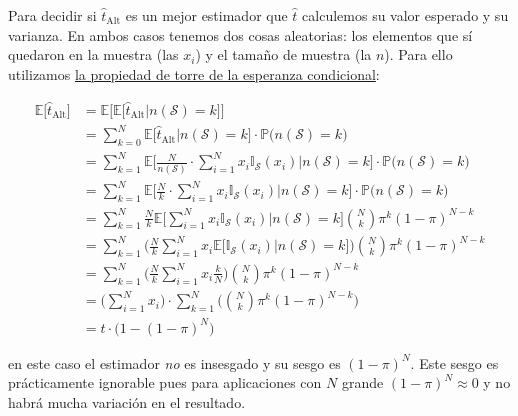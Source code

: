 \documentclass[
]{book}
\begin{document}
Para decidir si \(\hat{t}_{\text{Alt}}\) es un mejor estimador que \(\hat{t}\) calculemos su valor esperado y su varianza. En ambos casos tenemos dos cosas aleatorias: los elementos que sí quedaron en la muestra (las \(x_i\)) y el tamaño de muestra (la \(n\)). Para ello utilizamos \href{https://en.wikipedia.org/wiki/Law_of_total_expectation}{la propiedad de torre de la esperanza condicional}:

\begin{equation}\nonumber
\begin{aligned}
 \mathbb{E}\big[ \hat{t}_{\text{Alt}} \big] & = \mathbb{E}\Big[ \mathbb{E}\big[ \hat{t}_{\text{Alt}}  \big| n(\mathcal{S}) = k \big] \Big]   \\
 & = \sum\limits_{k = 0}^N  \mathbb{E}\Big[ \hat{t}_{\text{Alt}} \Big| n(\mathcal{S}) = k \Big]  \cdot \mathbb{P}\big(n(\mathcal{S}) = k\big)  
 \\ & =  \sum\limits_{k = 1}^N \mathbb{E}\Big[ \frac{N}{n(\mathcal{S})} \cdot \sum\limits_{i = 1}^{N} x_i \mathbb{I}_{\mathcal{S}}(x_i)  \Big| n(\mathcal{S}) = k \Big]  \cdot \mathbb{P}\big(n(\mathcal{S}) = k\big) 
 \\ & = 
\sum\limits_{k = 1}^N \mathbb{E}\Big[ \frac{N}{k} \cdot \sum\limits_{i = 1}^{N} x_i \mathbb{I}_{\mathcal{S}}(x_i) \Big| n(\mathcal{S}) = k \Big]  \cdot \mathbb{P}\big(n(\mathcal{S}) = k\big) 
\\ & = \sum\limits_{k = 1}^N \frac{N}{k} \mathbb{E}\Big[ \sum\limits_{i = 1}^N x_i\mathbb{I}_{\mathcal{S}}(x_i) \Big| n(\mathcal{S}) = k \Big] \binom{N}{k} \pi^k (1 - \pi)^{N - k}
\\ & = \sum\limits_{k = 1}^N  \Bigg( \frac{N}{k}\sum\limits_{i = 1}^N x_i \mathbb{E}\Big[\mathbb{I}_{\mathcal{S}}(x_i) \Big| n(\mathcal{S}) = k \Big]\Bigg) \binom{N}{k} \pi^k (1 - \pi)^{N - k}
\\ & = \sum\limits_{k = 1}^N  \Bigg( \frac{N}{k}\sum\limits_{i = 1}^N x_i \frac{k}{N} \Bigg) \binom{N}{k} \pi^k (1 - \pi)^{N - k}
\\ & = \Bigg( \sum\limits_{i = 1}^N x_i \Bigg) \cdot  \sum\limits_{k = 1}^N \Bigg( \binom{N}{k} \pi^k (1 - \pi)^{N - k}\Bigg) 
\\ & = t \cdot \big( 1 - (1 - \pi)^N\big)
\end{aligned}
\end{equation}

en este caso el estimador \emph{no} es insesgado y su sesgo es \((1 - \pi)^N\). Este sesgo es prácticamente ignorable pues para aplicaciones con \(N\) grande \((1 - \pi)^N \approx 0\) y no habrá mucha variación en el resultado.
\end{document}
